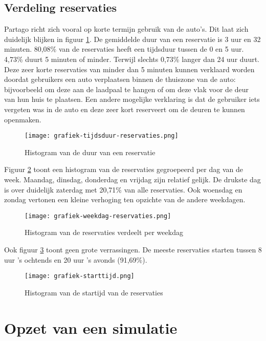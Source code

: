 \subsection{Verdeling reservaties}
Partago richt zich vooral op korte termijn gebruik van de auto's. Dit laat zich duidelijk blijken in figuur \ref{grafiek:gebruiksduur}.
De gemiddelde duur van een reservatie is 3 uur en 32 minuten. 80,08\% van de reservaties heeft een tijdsduur tussen de 0 en 5 uur. 4,73\% duurt 5 minuten of minder. Terwijl slechts 0,73\% langer dan 24 uur duurt. Deze zeer korte reservaties van minder dan 5 minuten kunnen verklaard worden doordat gebruikers een auto verplaatsen binnen de thuiszone van de auto: bijvoorbeeld om deze aan de laadpaal te hangen of om deze vlak voor de deur van hun huis te plaatsen. Een andere mogelijke verklaring is dat de gebruiker iets vergeten was in de auto en deze zeer kort reserveert om de deuren te kunnen openmaken.  
\begin{figure}[p]
	\texttt{[image: grafiek-tijdsduur-reservaties.png]}
	\caption[Duur van een reservatie]{Histogram van de duur van een reservatie}
	\label{grafiek:gebruiksduur}
\end{figure}
Figuur \ref{grafiek:weekdag} toont een histogram van de reservaties gegroepeerd per dag van de week. Maandag, dinsdag, donderdag en vrijdag zijn relatief gelijk. De drukste dag is over duidelijk zaterdag met 20,71\% van alle reservaties. Ook woensdag en zondag vertonen een kleine verhoging ten opzichte van de andere weekdagen.
\begin{figure}[p]
	\texttt{[image: grafiek-weekdag-reservaties.png]}
	\caption[Dag van de week van een reservatie]{Histogram van de reservaties verdeelt per weekdag}
	\label{grafiek:weekdag}
\end{figure}
Ook figuur \ref{grafiek:starttijd} toont geen grote verrassingen. De meeste reservaties starten tussen 8 uur 's ochtends en 20 uur 's avonds (91,69\%).
\begin{figure}[p]
	\texttt{[image: grafiek-starttijd.png]}
	\caption[Starttijd van een reservatie]{Histogram van de startijd van de reservaties}
	\label{grafiek:starttijd}
\end{figure}


\section{Opzet van een simulatie} \label{opzet-simulatie}
